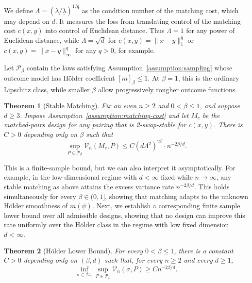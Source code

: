\documentclass[letterpaper,12pt]{article}
\newtheorem{thm}{Theorem}[section]
\theoremstyle{definition}
\numberwithin{equation}{section}
\newcommand{\mc}{\mathcal}
\begin{document}
We define $\Lambda=(\overline\lambda/\underline\lambda)^{1/q}$ as the condition number of the matching cost, which may depend on $d$.
It measures the loss from translating control of the matching cost $c(x,y)$ into control of Euclidean distance.
Thus $\Lambda=1$ for any power of Euclidean distance, while $\Lambda=\sqrt d$ for $c(x,y)=\|x-y\|_1^q$ or $c(x,y)=\|x-y\|_\infty^q$ for any $q>0$, for example.

Let $\mathcal P_\beta$ contain the laws satisfying Assumption~\ref{assumption:sampling} whose outcome model has H\"older coefficient $[m]_\beta\leq1$.
At $\beta=1$, this is the ordinary Lipschitz class, while smaller $\beta$ allow progressively rougher outcome functions.

\begin{thm}[Stable Matching]\label{theorem:stable-matching}
Fix an even $n\geq2$ and $0<\beta\leq1$, and suppose $d\geq3$.
Impose Assumption~\ref{assumption:matching-cost} and let $M_c$ be the matched-pairs design for any pairing that is 2-swap-stable for $c(x,y)$.
There is $C > 0$ depending only on $\beta$ such that
\begin{equation}\label{equation:stable-matching-high-d}
\sup_{P\in\mathcal P_\beta}\mc V_n(M_c,P) \leq C(d\Lambda^2)^{2\beta} \cdot n^{-2\beta/d}.
\end{equation}
\end{thm}

This is a finite-sample bound, but we can also interpret it asymptotically. 
For example, in the low-dimensional regime with $d<\infty$ fixed while $n\to\infty$, any stable matching as above attains the excess variance rate $n^{-2\beta/d}$.
This holds simultaneously for every $\beta\in(0,1]$, showing that matching adapts to the unknown H\"older smoothness of $m(\psi)$.
Next, we establish a corresponding finite sample lower bound over all admissible designs, showing that no design can improve this rate uniformly over the H\"older class in the regime with low fixed dimension $d < \infty$.

\begin{thm}[H\"older Lower Bound]\label{theorem:design-agnostic-lower-bound}
For every $0<\beta\leq1$, there is a constant $C>0$ depending only on $(\beta, d)$ such that, for every $n\geq2$ and every $d\geq1$,
\begin{equation}\label{equation:design-agnostic-lower-bound}
\inf_{\sigma\in\mathcal D_n} \sup_{P\in\mathcal P_\beta}\mc V_n(\sigma,P) \geq C n^{-2\beta/d}.
\end{equation}
\end{thm}
\end{document}
